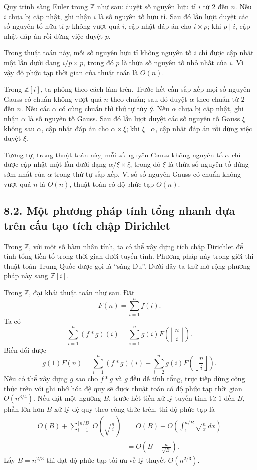 \documentclass[11pt]{article}
\begin{document}
Quy trình sàng Euler trong \(\mathbb Z\) như sau: duyệt số nguyên hữu tỉ \(i\)
từ \(2\) đến \(n\). Nếu \(i\) chưa bị cập nhật, ghi nhận \(i\) là số nguyên tố
hữu tỉ. Sau đó lần lượt duyệt các số nguyên tố hữu tỉ \(p\) không vượt quá
\(i\), cập nhật đáp án cho \(i\times p\); khi \(p\mid i\), cập nhật đáp án rồi
dừng việc duyệt \(p\).

Trong thuật toán này, mỗi số nguyên hữu tỉ không nguyên tố \(i\) chỉ được cập
nhật một lần dưới dạng \(i/p\times p\), trong đó \(p\) là thừa số nguyên tố
nhỏ nhất của \(i\). Vì vậy độ phức tạp thời gian của thuật toán là \(O(n)\).

Trong \(\mathbb Z[i]\), ta phỏng theo cách làm trên. Trước hết cần sắp xếp
mọi số nguyên Gauss có chuẩn không vượt quá \(n\) theo chuẩn; sau đó duyệt
\(\alpha\) theo chuẩn từ \(2\) đến \(n\). Nếu các \(\alpha\) có cùng chuẩn thì
thứ tự tùy ý. Nếu \(\alpha\) chưa bị cập nhật, ghi nhận \(\alpha\) là số
nguyên tố Gauss. Sau đó lần lượt duyệt các số nguyên tố Gauss \(\xi\) không
sau \(\alpha\), cập nhật đáp án cho \(\alpha\times\xi\); khi
\(\xi\mid\alpha\), cập nhật đáp án rồi dừng việc duyệt \(\xi\).

Tương tự, trong thuật toán này, mỗi số nguyên Gauss không nguyên tố
\(\alpha\) chỉ được cập nhật một lần dưới dạng \(\alpha/\xi\times\xi\), trong
đó \(\xi\) là thừa số nguyên tố đứng sớm nhất của \(\alpha\) trong thứ tự sắp
xếp. Vì số số nguyên Gauss có chuẩn không vượt quá \(n\) là \(O(n)\), thuật
toán có độ phức tạp \(O(n)\).

\subsection*{8.2. Một phương pháp tính tổng nhanh dựa trên cấu tạo tích chập
Dirichlet}

Trong \(\mathbb Z\), với một số hàm nhân tính, ta có thể xây dựng tích chập
Dirichlet để tính tổng tiền tố trong thời gian dưới tuyến tính. Phương pháp
này trong giới thi thuật toán Trung Quốc được gọi là ``sàng Du''. Dưới đây ta
thử mở rộng phương pháp này sang \(\mathbb Z[i]\).

Trong \(\mathbb Z\), đại khái thuật toán như sau. Đặt
\[
  F(n)=\sum_{i=1}^n f(i).
\]
Ta có
\[
  \sum_{i=1}^n(f*g)(i)=\sum_{i=1}^n g(i)F\!\left(\left\lfloor\frac ni\right\rfloor\right).
\]
Biến đổi được
\[
  g(1)F(n)=\sum_{i=1}^n(f*g)(i)
    -\sum_{i=2}^n g(i)F\!\left(\left\lfloor\frac ni\right\rfloor\right).
\]
Nếu có thể xây dựng \(g\) sao cho \(f*g\) và \(g\) đều dễ tính tổng, trực
tiếp dùng công thức trên với ghi nhớ hóa đệ quy sẽ được thuật toán có độ phức
tạp thời gian \(O(n^{3/4})\). Nếu đặt một ngưỡng \(B\), trước hết tiền xử lý
tuyến tính từ \(1\) đến \(B\), phần lớn hơn \(B\) xử lý đệ quy theo công thức
trên, thì độ phức tạp là
\[
\begin{aligned}
  O(B)+\sum_{i=1}^{\lfloor n/B\rfloor} O\!\left(\sqrt{\frac ni}\right)
  &=O(B)+O\!\left(\int_1^{n/B}\sqrt{\frac nx}\,dx\right)\\
  &=O\!\left(B+\frac n{\sqrt B}\right).
\end{aligned}
\]
Lấy \(B=n^{2/3}\) thì đạt độ phức tạp tối ưu về lý thuyết \(O(n^{2/3})\).
\end{document}
